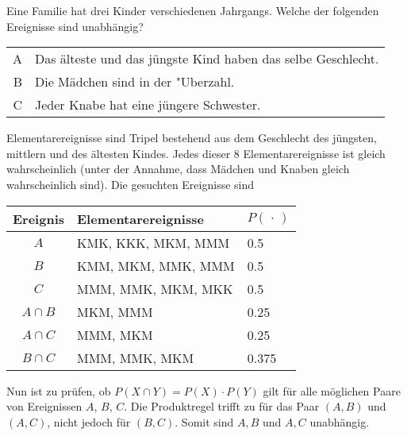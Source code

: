 Eine Familie hat drei Kinder verschiedenen Jahrgangs. Welche der
folgenden Ereignisse sind unabhängig?

\begin{tabular}{rl}
A & Das älteste und das jüngste Kind haben das selbe Geschlecht.\\
B & Die Mädchen sind in der "Uberzahl.\\
C & Jeder Knabe hat eine jüngere Schwester.
\end{tabular}


\begin{loesung}
Elementarereignisse sind Tripel bestehend aus dem Geschlecht
des jüngsten, mittlern und des ältesten Kindes.
Jedes dieser 8 Elementarereignisse ist gleich wahrscheinlich (unter
der Annahme, dass Mädchen und Knaben gleich wahrscheinlich sind). Die
gesuchten Ereignisse sind
\begin{center}
\begin{tabular}{|c|l|l|}
\hline
Ereignis&Elementarereignisse&$P(\,\cdot\,)$\\
\hline
$A$&KMK, KKK, MKM, MMM&0.5\\
$B$&KMM, MKM, MMK, MMM&0.5\\
$C$&MMM, MMK, MKM, MKK&0.5\\
\hline
$A\cap B$&MKM, MMM&0.25\\
$A\cap C$&MMM, MKM&0.25\\
$B\cap C$&MMM, MMK, MKM&0.375\\
\hline
\end{tabular}
\end{center}
Nun ist zu prüfen, ob $P(X\cap Y)=P(X)\cdot P(Y)$ gilt für alle
möglichen Paare von Ereignissen $A$, $B$, $C$.
Die Produktregel trifft zu für
das Paar $(A,B)$ und $(A,C)$, nicht jedoch für $(B,C)$.
Somit sind $A,B$ und $A,C$ unabhängig.
\end{loesung}

